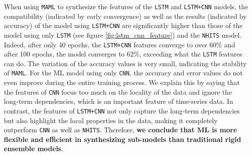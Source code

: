 \documentclass[aps,prb,groupedaddress,twocolumn,showpacs,dvipdfmx,superscriptaddress,pdftex]{revtex4-2}
\begin{document}

When using \verb|MAML| to synthesize the features of the \verb|LSTM| and \verb|LSTM+CNN| models, the compatibility (indicated by early convergence) as well as the results (indicated by accuracy) of the model using \verb|LSTM+CNN| are significantly higher than those of the model using only \verb|LSTM| (see figure \ref{fig:lstm_cnn_feature}) and the \verb|NHITS| model. Indeed, after only 40 epochs, the \verb|LSTM+CNN| features converge to over 60\% and after 100 epochs, the model converges to 62\%, exceeding what the \verb|LSTM| features can do. The variation of the accuracy values ​​is very small, indicating the stability of \verb|MAML|. For the ML model using only \verb|CNN|, the accuracy and error values ​​do not even improve during the entire training process. We explain this by saying that the features of \verb|CNN| focus too much on the locality of the data and ignore the long-term dependencies, which is an important feature of time-series data. In contrast, the features of \verb|LSTM+CNN| not only capture the long-term dependencies but also highlight the local properties in the data, making it completely outperform \verb|CNN| as well as \verb|NHITS|. Therefore, \textbf{we conclude that ML is more flexible and efficient in synthesizing sub-models than traditional rigid ensemble models}.
\end{document}

